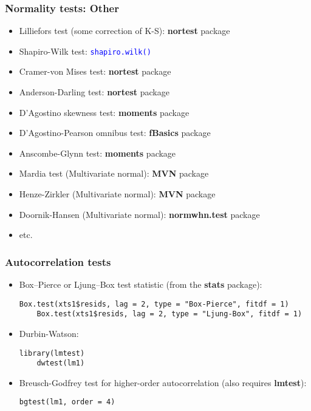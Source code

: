 \documentclass[10pt]{beamer}
\newcommand{\cc}[1]{\texttt{\textcolor{blue}{#1}}}
\theoremstyle{definition}
\begin{document}
\begin{frame}[fragile]
\frametitle{Normality tests: Other}
\begin{itemize}
	\item Lilliefors test (some correction of K-S): \textbf{nortest} package
	\item Shapiro-Wilk test: \cc{shapiro.wilk()}
	\item Cramer-von Mises test: \textbf{nortest} package
	\item Anderson-Darling test: \textbf{nortest} package
	\item D'Agostino skewness test: \textbf{moments} package
	\item D'Agostino-Pearson omnibus test: \textbf{fBasics} package
	\item Anscombe-Glynn test: \textbf{moments} package
	\item Mardia test (Multivariate normal): \textbf{MVN} package
	\item Henze-Zirkler (Multivariate normal): \textbf{MVN} package
	\item Doornik-Hansen (Multivariate normal): \textbf{normwhn.test} package
	\item etc.
\end{itemize}
\end{frame}

\begin{frame}[fragile]
\frametitle{Autocorrelation tests}
\begin{itemize}
	\item Box–Pierce or Ljung–Box test statistic (from the \textbf{stats} package):
	\begin{lstlisting}[style = rstyle, breaklines]
	Box.test(xts1$resids, lag = 2, type = "Box-Pierce", fitdf = 1)
	Box.test(xts1$resids, lag = 2, type = "Ljung-Box", fitdf = 1)
	\end{lstlisting}
	\item Durbin-Watson:
	\begin{lstlisting}[style = rstyle, breaklines]
	library(lmtest)
	dwtest(lm1)	
	\end{lstlisting}
	\item Breusch-Godfrey test for higher-order autocorrelation (also requires \textbf{lmtest}):
	\begin{lstlisting}[style = rstyle, breaklines]
	bgtest(lm1, order = 4)	
	\end{lstlisting}
\end{itemize}
\end{frame}
\end{document}
